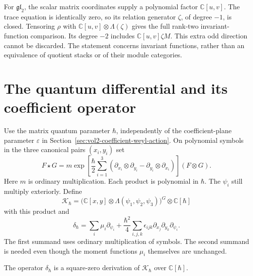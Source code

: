 For $\mathfrak{gl}_2$, the scalar matrix coordinates supply a polynomial
factor $\mathbb C[u,v]$. The trace equation is identically zero,
so its relation generator $\zeta$, of degree $-1$, is closed.
Tensoring $\rho$ with
$\mathbb C[u,v]\otimes\Lambda(\zeta)$ gives the full rank-two
invariant-function comparison. Its degree $-2$ includes
$\mathbb C[u,v]\zeta M$. This extra odd direction cannot be discarded.
The statement concerns invariant functions, rather than an equivalence
of quotient stacks or of their module categories.

\section{The quantum differential and its coefficient operator}
\label{sec:vol2-relative-quantum-differential}

Use the matrix quantum parameter $\hbar$, independently of the
coefficient-plane parameter $\varepsilon$ in
Section~\ref{sec:vol2-coefficient-weyl-action}.
On polynomial symbols in the three canonical pairs $(x_i,y_i)$ set
\begin{equation}\label{eq:vol2-relative-moyal}
 F\star G
 =m\exp\left[
   \frac{\hbar}{2}\sum_{i=1}^3
   \left(\partial_{x_i}\otimes\partial_{y_i}
          -\partial_{y_i}\otimes\partial_{x_i}\right)
       \right](F\otimes G).
\end{equation}
Here $m$ is ordinary multiplication. Each product is polynomial in
$\hbar$. The $\psi_i$ still multiply
exteriorly. Define
\[
 \mathcal K_\hbar
   =\bigl(\mathbb C[x,y]\otimes\Lambda(\psi_1,\psi_2,\psi_3)
      \bigr)^G\otimes\mathbb C[\hbar]
\]
with this product and
\begin{equation}\label{eq:vol2-relative-quantum-differential}
 \delta_\hbar
 =\sum_i\mu_i\partial_{\psi_i}
  +\frac{\hbar^2}{4}
    \sum_{i,j,k}\epsilon_{ijk}
       \partial_{x_j}\partial_{y_k}\partial_{\psi_i}.
\end{equation}
The first summand uses ordinary multiplication of symbols.
The second summand is needed even though the moment functions
$\mu_i$ themselves are unchanged.

\begin{proposition}\label{prop:vol2-relative-quantum-dg}
The operator $\delta_\hbar$ is a square-zero derivation of
$\mathcal K_\hbar$ over $\mathbb C[\hbar]$.
\end{proposition}


